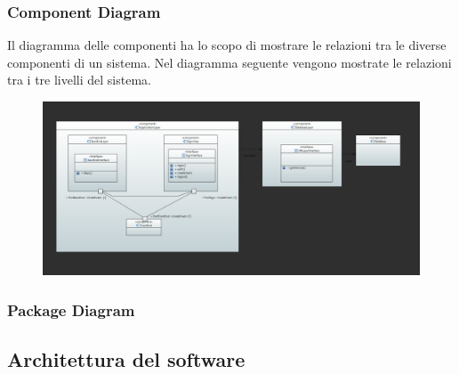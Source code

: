 \documentclass[a4paper,12pt]{article}
\begin{document}
\subsubsection{Component Diagram}
Il diagramma delle componenti ha lo scopo di mostrare le relazioni tra le diverse componenti di un sistema. Nel diagramma seguente vengono mostrate le relazioni tra i tre livelli del sistema.
\begin{figure}[H]
    \centering
    \includegraphics[width=1\textwidth]{../UML/UML png/diagramma dei Componenti.png}
    \label{fig:Component Diagram}
\end{figure}
\subsubsection{Package Diagram}

\subsection{Architettura del software}
\end{document}
